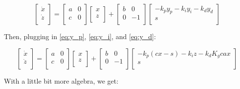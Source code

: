 \documentclass[10pt,letterpaper]{article}
\begin{document}
\[
\begin{bmatrix}
    \dot{x} \\
    \dot{z} \\
\end{bmatrix} =
\begin{bmatrix}
	a & 0 \\
	c & 0 \\
\end{bmatrix}
\begin{bmatrix}
	x \\
	z \\
\end{bmatrix} + 
\begin{bmatrix}
	b & 0 \\
	0 & -1 \\
\end{bmatrix}
\begin{bmatrix}
	-k_p y_p -k_i y_i - k_d y_d \\
	s \\
\end{bmatrix}
\]

Then, plugging in \ref{eq:y_p}, \ref{eq:y_i}, and \ref{eq:y_d}:

\[
\begin{bmatrix}
    \dot{x} \\
    \dot{z} \\
\end{bmatrix} =
\begin{bmatrix}
	a & 0 \\
	c & 0 \\
\end{bmatrix}
\begin{bmatrix}
	x \\
	z \\
\end{bmatrix} + 
\begin{bmatrix}
	b & 0 \\
	0 & -1 \\
\end{bmatrix}
\begin{bmatrix}
	-k_p (cx - s) -k_i z - k_d K_g c a x \\
	s \\
\end{bmatrix}
\]

With a little bit more algebra, we get:
\end{document}
